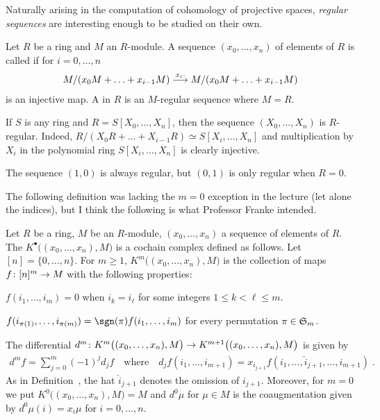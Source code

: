 \documentclass[a4paper,parskip=half,numbers=enddot, DIV=12]{scrreprt}
\begin{document}
Naturally arising in the computation of cohomology of projective spaces, \emph{regular sequences} are interesting enough to be studied on their own.
\begin{defi}
	Let $R$ be a ring and $M$ an $R$-module. A sequence $(x_0,\ldots,x_n)$ of elements of $R$ is called  if for $i=0,\ldots,n$
	\begin{align*}
		M/(x_0M+\ldots+x_{i-1}M)\morphism[x_i\cdot]M/(x_0M+\ldots+x_{i-1}M)
	\end{align*}
	is an injective map. A  in $R$ is an $M$-regular sequence where $M=R$.
\end{defi}
\begin{example}
	\begin{alphanumerate}
		\item {}If $S$ is any ring and $R=S[X_0,\ldots,X_n]$, then the sequence $(X_0,\ldots,X_n)$ is $R$-regular. Indeed, $R/(X_0R+\ldots+X_{i-1}R)\simeq S[X_i,\ldots,X_n]$ and multiplication by $X_i$ in the polynomial ring $S[X_i,\ldots,X_n]$ is clearly injective.
		\item The sequence $(1,0)$ is always regular, but $(0,1)$ is only regular when $R=0$.
	\end{alphanumerate}
\end{example}
The following definition was lacking the $m=0$ exception in the lecture (let alone the indices), but I think the following is what Professor Franke intended.
\begin{defi}
	Let $R$ be a ring, $M$ be an $R$-module, $(x_0,\ldots,x_n)$ a sequence of elements of $R$. The  $K^\bullet\big((x_0,\ldots,x_n),M\big)$ is a cochain complex defined as follows. Let $[n]=\{0,\ldots,n\}$. For $m\geq1$, $K^m\big((x_0,\ldots,x_n),M\big)$ is the collection of maps $f\colon [n]^m\morphism M$ with the following properties:
	\begin{alphanumerate}
		\item $f(i_1,\ldots,i_m)=0$ when $i_k=i_\ell$ for some integers $1\leq k<\ell\leq m$.
		\item $f(i_{\pi(1)},\ldots,i_{\pi(m)})=\sgn(\pi)f(i_1,\ldots,i_m)$ for every permutation $\pi\in\mathfrak{S}_m$.
	\end{alphanumerate}
	The differential $d^m\colon K^m\big((x_0,\ldots,x_n),M\big)\morphism K^{m+1}\big((x_0,\ldots,x_n),M\big)$ is given by 
	\begin{align*}
		d^mf=\sum_{j=0}^m(-1)^jd_jf\quad\text{where}\quad d_jf(i_1,\ldots,i_{m+1})=x_{i_{j+1}}f(i_1,\ldots,\hat{i}_{j+1},\ldots,i_{m+1})\;.
	\end{align*}
	As in Definition~, the hat $\hat{i}_{j+1}$ denotes the omission of $i_{j+1}$. Moreover, for $m=0$ we put $K^0\big((x_0,\ldots,x_n),M\big)=M$ and $d^0\mu$ for $\mu\in M$ is the coaugmentation given by $d^0\mu(i)=x_i\mu$ for $i=0,\ldots,n$.
\end{defi}
\end{document}
